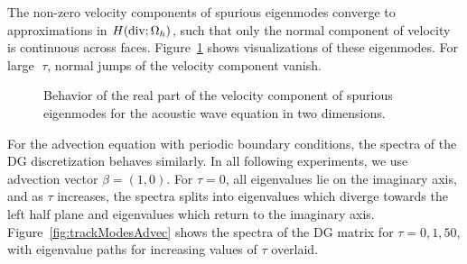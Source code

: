 \documentclass[10pt]{article}
\newcommand{\Oh}{\Omega_h}
\begin{document}
The non-zero velocity components of spurious eigenmodes converge to approximations in $H({\rm div}; \Oh)$, such that only the normal component of velocity is continuous across faces.  Figure~\ref{fig:trackModesWaveU} shows visualizations of these eigenmodes.  For large $\tau$, normal jumps of the velocity component vanish.  %

\begin{figure}
\centering
{}
\hspace{.5em}
\hspace{.5em}
\caption{Behavior of the real part of the velocity component of spurious eigenmodes for the acoustic wave equation in two dimensions.  }
\label{fig:trackModesWaveU}
\end{figure}


For the advection equation with periodic boundary conditions, the spectra of the DG discretization behaves similarly.  In all following experiments, we use advection vector $\beta = (1,0)$.  For $\tau=0$, all eigenvalues lie on the imaginary axis, and as $\tau$ increases, the spectra splits into eigenvalues which diverge towards the left half plane and eigenvalues which return to the imaginary axis.  Figure~\ref{fig:trackModesAdvec} shows the spectra of the DG matrix for $\tau = 0,1,50$, with eigenvalue paths for increasing values of $\tau$ overlaid.  
\end{document}
